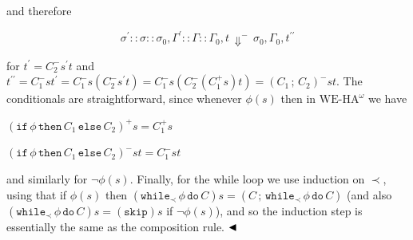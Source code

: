 and therefore\par
  
\par  \quad  \[{\sigma^{\prime}::\sigma::\sigma_{0}},{\Gamma^{\prime}::\Gamma::\Gamma_{0}},{t}\,{\Downarrow^{-}}\,{\sigma_{0}},{\Gamma_{0}},{t^{\prime\prime}}\]\quad  \quad  
  
for $t^{\prime}=C_{2}^{-}s^{\prime}t$ and $t^{\prime\prime}=C_{1}^{-}st^{\prime}=C_{1}^{-}s(C_{2}^{-}s^{\prime}t)=C_{1}^{-}s(C_{2}^{-}(C_{1}^{+}s)t)=({C_{1}}\,;\,{C_{2}})^{-}st$. The conditionals are straightforward, since whenever $\phi(s)$ then in $\mathrm{WE}\mbox{-}\mathrm{HA}^{\omega}$ we have\par
  
\par  \quad  $\displaystyle(\mathtt{if}\,{\phi}\,\mathtt{then}\,{C_{1}}\,\mathtt{else}\,{C_{2}})^{+}s$\quad  $\displaystyle=C_{1}^{+}s$\quad  \quad  
 
\par  \quad  $\displaystyle(\mathtt{if}\,{\phi}\,\mathtt{then}\,{C_{1}}\,\mathtt{else}\,{C_{2}})^{-}st$\quad  $\displaystyle=C_{1}^{-}st$\quad  \quad  
  
and similarly for $\neg\phi(s)$. Finally, for the while loop we use induction on $\prec$, using that if $\phi(s)$ then $(\mathtt{while}_{\prec}\,{\phi}\,\mathtt{do}\,{C})s=({C}\,;\,{\mathtt{while}_{\prec}\,{\phi}\,\mathtt{do}\,{C}})$ (and also $(\mathtt{while}_{\prec}\,{\phi}\,\mathtt{do}\,{C})s=(\mathtt{skip})s$ if $\neg\phi(s)$), and so the induction step is essentially the same as the composition rule. $\hfill\blacktriangleleft$\par
 
 
 
\par
 
 
 
